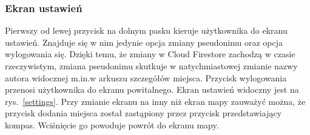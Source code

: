         \subsubsection{Ekran ustawień}
        Pierwszy od lewej przycisk na dolnym pasku kieruje użytkownika do ekranu ustawień. Znajduje się w nim jedynie opcja zmiany pseudonimu oraz opcja wylogowania się. Dzięki
        temu, że zmiany w Cloud Firestore zachodzą w czasie rzeczywistym, zmiana pseudonimu skutkuje w natychmiastowej zmianie nazwy autora widocznej m.in.\@ w arkuszu szczegółów miejsca.
        Przycisk wylogowania przenosi użytkownika do ekranu powitalnego. Ekran ustawień widoczny jest na rys.~\ref{settings}. Przy zmianie ekranu na inny niż ekran mapy zauważyć można, że
        przycisk dodania miejsca został zastąpiony przez przycisk przedstawiający kompas. Wciśnięcie go powoduje powrót do ekranu mapy.

